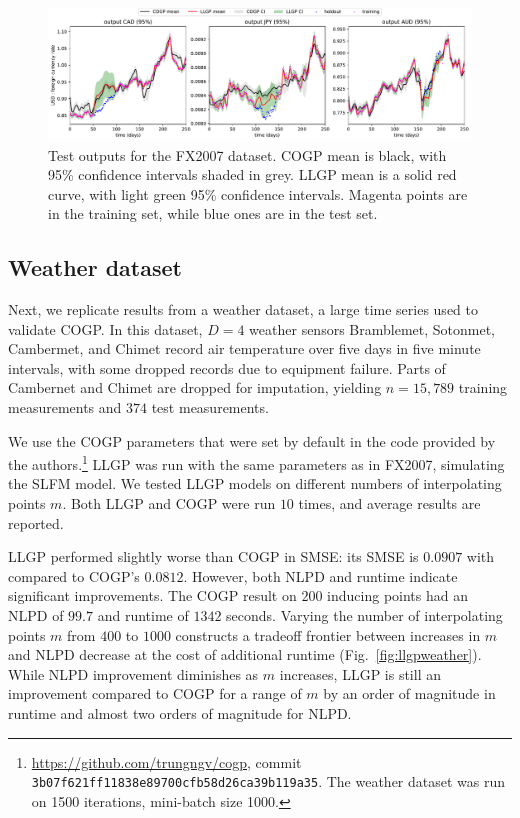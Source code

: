 \documentclass{article}
\begin{document}
\begin{figure}[!ht]
\vskip 0.2in
\begin{center}
\centerline{\includegraphics[width=\textwidth]{fx2007graph.pdf}}
\caption{Test outputs for the FX2007 dataset. COGP mean is black, with 95\% confidence intervals shaded in grey. LLGP mean is a solid red curve, with light green 95\% confidence intervals. Magenta points are in the training set, while blue ones are in the test set.} %
\label{fx2007-graph}
\end{center}
\vskip -0.2in
\end{figure}

\subsection{Weather dataset}\label{large-bench}

Next, we replicate results from a weather dataset, a large time series used to validate COGP. In this dataset, $D=4$ weather sensors Bramblemet, Sotonmet, Cambermet, and Chimet record air temperature over five days in five minute intervals, with some dropped records due to equipment failure. Parts of Cambernet and Chimet are dropped for imputation, yielding $n=15,789$ training measurements and $374$ test measurements. 

We use the COGP parameters that were set by default in the code provided by the authors.\footnote{\url{https://github.com/trungngv/cogp}, commit \texttt{3b07f621ff11838e89700cfb58d26ca39b119a35}. The weather dataset was run on 1500 iterations, mini-batch size 1000.} LLGP was run with the same parameters as in FX2007, simulating the SLFM model. We tested LLGP models on different numbers of interpolating points $m$. Both LLGP and COGP were run $10$ times, and average results are reported.

LLGP performed slightly worse than COGP in SMSE: its SMSE is $0.0907$ with compared to COGP's $0.0812$. However, both NLPD and runtime indicate significant improvements. The COGP result on $200$ inducing points had an NLPD of $99.7$ and runtime of $1342$ seconds. Varying the number of interpolating points $m$ from $400$ to $1000$ constructs a tradeoff frontier between increases in $m$ and NLPD decrease at the cost of additional runtime (Fig.~\ref{fig:llgpweather}). While NLPD improvement diminishes as $m$ increases, LLGP is still an improvement compared to COGP for a range of $m$ by an order of magnitude in runtime and almost two orders of magnitude for NLPD.
\end{document}
